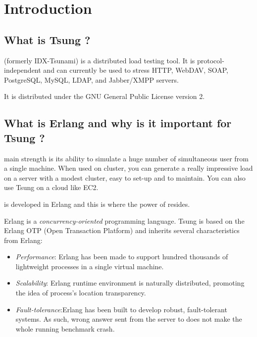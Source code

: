 \documentclass{TSUNG-en}
\begin{document}
\maketitle
\newpage
\tableofcontents

\section{Introduction}

\subsection{What is Tsung ?}

 (formerly IDX-Tsunami) is a distributed load testing tool. It is
 protocol-independent and can currently be used to stress HTTP, WebDAV, SOAP,
PostgreSQL, MySQL, LDAP, and Jabber/XMPP servers.

It is distributed under the GNU General Public License version 2.


\subsection{What is Erlang and why is it important for Tsung ?}

 main strength is its ability to simulate a huge number of
simultaneous user from a single machine. When used on cluster, you can
generate a really impressive load on a server with a modest cluster,
easy to set-up and to maintain. You can also use Tsung on a cloud like EC2.

 is developed in Erlang and this is where the power
of  resides.

\par Erlang is a \emph{concurrency-oriented} programming language.
Tsung is based on the Erlang OTP (Open Transaction Platform) and
inherits several characteristics from Erlang:

\begin{itemize}
\item \emph{Performance}: Erlang has been made to support hundred thousands
of lightweight processes in a single virtual machine.
\item \emph{Scalability}: Erlang runtime environment is naturally
distributed, promoting the idea of process's location transparency.
\item \emph{Fault-tolerance}:Erlang has been built to develop robust,
fault-tolerant systems. As such, wrong answer sent from the server
to  does not make the whole running benchmark crash.
\end{itemize}
\end{document}
